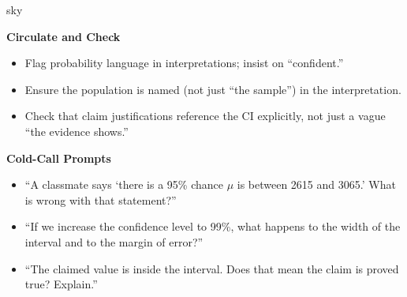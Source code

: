 \documentclass[10pt]{article}
\begin{document}
\begin{skillbox}{sky}
\begin{minipage}[t]{0.48\linewidth}
    \textbf{Circulate and Check}
    \begin{itemize}
        \item Flag probability language in interpretations; insist on ``confident.''
        \item Ensure the population is named (not just ``the sample'') in the
              interpretation.
        \item Check that claim justifications reference the CI explicitly, not just
              a vague ``the evidence shows.''
    \end{itemize}
\end{minipage}
\hfill
\begin{minipage}[t]{0.48\linewidth}
    \textbf{Cold-Call Prompts}
    \begin{itemize}
        \item ``A classmate says `there is a 95\% chance $\mu$ is between 2615 and
              3065.' What is wrong with that statement?''
        \item ``If we increase the confidence level to 99\%, what happens to the
              width of the interval and to the margin of error?''
        \item ``The claimed value is inside the interval. Does that mean the claim
              is proved true? Explain.''
    \end{itemize}
\end{minipage}
\end{skillbox}
\end{document}
